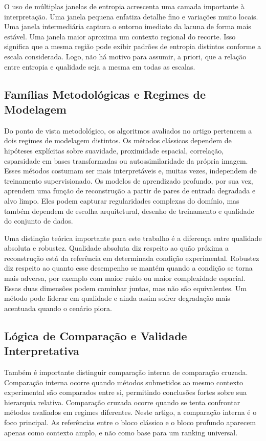O uso de múltiplas janelas de entropia acrescenta uma camada importante à interpretação.
Uma janela pequena enfatiza detalhe fino e variações muito locais.
Uma janela intermediária captura o entorno imediato da lacuna de forma mais estável.
Uma janela maior aproxima um contexto regional do recorte.
Isso significa que a mesma região pode exibir padrões de entropia distintos conforme a escala considerada.
Logo, não há motivo para assumir, a priori, que a relação entre entropia e qualidade seja a mesma em todas as escalas.

\subsection{Famílias Metodológicas e Regimes de Modelagem}

Do ponto de vista metodológico, os algoritmos avaliados no artigo pertencem a dois regimes de modelagem distintos.
Os métodos clássicos dependem de hipóteses explícitas sobre suavidade, proximidade espacial, correlação, esparsidade em bases transformadas ou autossimilaridade da própria imagem.
Esses métodos costumam ser mais interpretáveis e, muitas vezes, independem de treinamento supervisionado.
Os modelos de aprendizado profundo, por sua vez, aprendem uma função de reconstrução a partir de pares de entrada degradada e alvo limpo.
Eles podem capturar regularidades complexas do domínio, mas também dependem de escolha arquitetural, desenho de treinamento e qualidade do conjunto de dados.

Uma distinção teórica importante para este trabalho é a diferença entre qualidade absoluta e robustez.
Qualidade absoluta diz respeito ao quão próxima a reconstrução está da referência em determinada condição experimental.
Robustez diz respeito ao quanto esse desempenho se mantém quando a condição se torna mais adversa, por exemplo com maior ruído ou maior complexidade espacial.
Essas duas dimensões podem caminhar juntas, mas não são equivalentes.
Um método pode liderar em qualidade e ainda assim sofrer degradação mais acentuada quando o cenário piora.

\subsection{Lógica de Comparação e Validade Interpretativa}

Também é importante distinguir comparação interna de comparação cruzada.
Comparação interna ocorre quando métodos submetidos ao mesmo contexto experimental são comparados entre si, permitindo conclusões fortes sobre sua hierarquia relativa.
Comparação cruzada ocorre quando se tenta confrontar métodos avaliados em regimes diferentes.
Neste artigo, a comparação interna é o foco principal.
As referências entre o bloco clássico e o bloco profundo aparecem apenas como contexto amplo, e não como base para um ranking universal.

